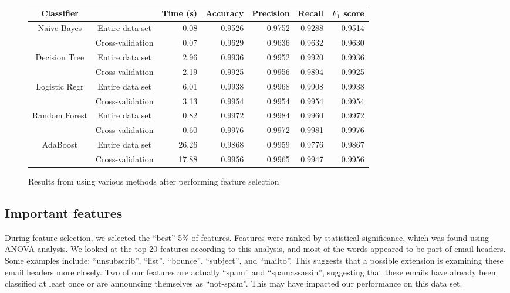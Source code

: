 \documentclass{article} %
\begin{document}
\begin{figure}[h]
  \begin{tabular}[h]{ | c | c | r | r | r | r | r | }
    \hline
    Classifier    &                  & Time (s) & Accuracy & Precision & Recall & $F_1$ score  \\ \hline
    Naive Bayes   & Entire data set  & 0.08     & 0.9526   & 0.9752    & 0.9288 & 0.9514 \\ \cline{2-7}
                  & Cross-validation & 0.07     & 0.9629   & 0.9636    & 0.9632 & 0.9630 \\ \hline
    Decision Tree & Entire data set  & 2.96     & 0.9936   & 0.9952    & 0.9920 & 0.9936 \\ \cline{2-7}
                  & Cross-validation & 2.19     & 0.9925   & 0.9956    & 0.9894 & 0.9925 \\ \hline
    Logistic Regr & Entire data set  & 6.01     & 0.9938   & 0.9968    & 0.9908 & 0.9938 \\ \cline{2-7}
                  & Cross-validation & 3.13     & 0.9954   & 0.9954    & 0.9954 & 0.9954 \\ \hline
    Random Forest & Entire data set  & 0.82     & 0.9972   & 0.9984    & 0.9960 & 0.9972 \\ \cline{2-7}
                  & Cross-validation & 0.60     & 0.9976   & 0.9972    & 0.9981 & 0.9976 \\ \hline
    AdaBoost      & Entire data set  & 26.26    & 0.9868   & 0.9959    & 0.9776 & 0.9867 \\ \cline{2-7}
                  & Cross-validation & 17.88    & 0.9956   & 0.9965    & 0.9947 & 0.9956 \\ \hline
  \end{tabular}
  \caption{Results from using various methods after performing feature selection}
  \label{fig:table_selected}
\end{figure}

\subsection{Important features}
During feature selection, we selected the ``best'' 5\% of features. Features were ranked by statistical significance, which was found using ANOVA analysis. We looked at the top 20 features according to this analysis, and most of the words appeared to be part of email headers. Some examples include: ``unsubscrib'', ``list'', ``bounce'', ``subject'', and ``mailto''. This suggests that a possible extension is examining these email headers more closely. Two of our features are actually ``spam'' and ``spamassassin'', suggesting that these emails have already been classified at least once or are announcing themselves as ``not-spam''. This may have impacted our performance on this data set. 
\end{document}

